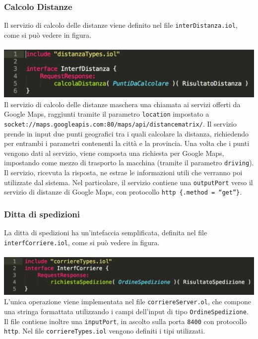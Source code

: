\subsubsection*{Calcolo Distanze}
Il servizio di calcolo delle distanze viene definito nel file
{\tt interDistanza.iol}, come si pu\`o vedere in figura. \\\\
\includegraphics[scale=0.5]{immagini/interfDistanza.png}\\
Il servizio di calcolo delle distanze maschera una chiamata ai servizi
offerti da Google Maps, raggiunti tramite il parametro {\tt location}
impostato a \\
{\tt socket://maps.googleapis.com:80/maps/api/distancematrix/}.
Il servizio prende in input due punti geografici tra i quali calcolare
la distanza, richiedendo per entrambi i parametri contenenti la citt\`a
e la provincia. Una volta che i punti vengono dati al servizio, viene
composta una richiesta per Google Maps, impostando come mezzo di
trasporto la macchina (tramite il parametro {\tt driving}). Il servizio,
ricevuta la risposta, ne estrae le informazioni utili che verranno poi
utilizzate dal sistema.
Nel particolare, il servizio contiene una {\tt outputPort} verso il
servizio di distanze di Google Maps, con protocollo
{\tt http \{.method = ``get''\}}.


\subsubsection*{Ditta di spedizioni}
La ditta di spedizioni ha un'intefaccia semplificata, definita nel file
{\tt interfCorriere.iol}, come si pu\`o vedere in figura. \\\\
\includegraphics[scale=0.5]{immagini/interfCorriere.png}\\
L'unica operazione viene implementata nel file {\tt corriereServer.ol},
che compone una stringa formattata utilizzando i campi dell'input di
tipo {\tt OrdineSpedizione}.
Il file contiene inoltre una {\tt inputPort}, in ascolto sulla porta
{\tt 8400} con protocollo {\tt http}.
Nel file {\tt corriereTypes.iol} vengono definiti i tipi utilizzati.


